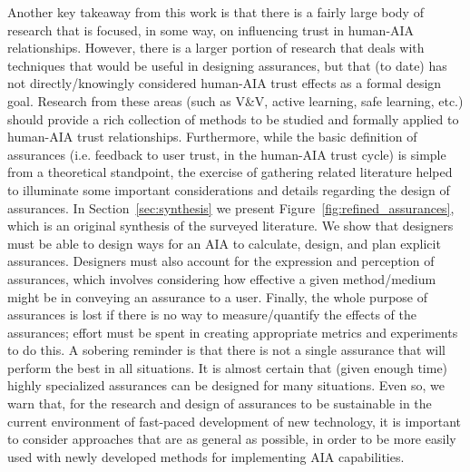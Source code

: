    Another key takeaway from this work is that there is a fairly large body of research that is focused, in some way, on influencing trust in human-AIA relationships. However, there is a larger portion of research that deals with techniques that would be useful in designing assurances, but that (to date) has not directly/knowingly considered human-AIA trust effects as a formal design goal. 
    Research from these areas (such as V\&V, active learning, safe learning, etc.) should provide a rich collection of methods to be studied and formally applied to human-AIA trust relationships.
Furthermore, while the basic definition of assurances (i.e. feedback to user trust, in the human-AIA trust cycle) is simple from a theoretical standpoint, the exercise of gathering related literature helped to illuminate some important considerations and details regarding the design of assurances. In Section~\ref{sec:synthesis} we present Figure~\ref{fig:refined_assurances}, which is an original synthesis of the surveyed literature. We show that designers must be able to design ways for an AIA to calculate, design, and plan explicit assurances. Designers must also account for the expression and perception of assurances, which involves considering how effective a given method/medium might be in conveying an assurance to a user. 
Finally, the whole purpose of assurances is lost if there is no way to measure/quantify the effects of the assurances; effort must be spent in creating appropriate metrics and experiments to do this. A sobering reminder is that there is not a single assurance that will perform the best in all situations. It is almost certain that (given enough time) highly specialized assurances can be designed for many situations. Even so, we warn that, for the research and design of assurances to be sustainable in the current environment of fast-paced development of new technology, it is important to consider approaches that are as general as possible, in order to be more easily used with newly developed methods for implementing AIA capabilities.

